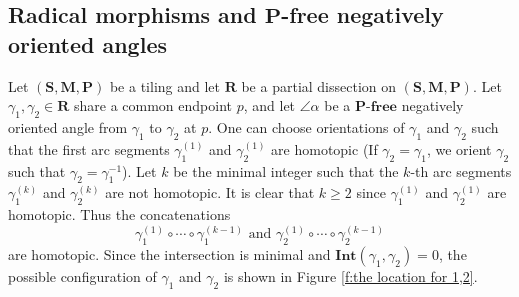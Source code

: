 \documentclass[a4paper,10pt]{amsart}
\theoremstyle{plain}          %
\theoremstyle{definition}
\newtheorem{definition}[theorem]{Definition}
\def\SS{\mathbf{S}}
\def\MM{\mathbf{M}}
\def\PP{\mathbf{P}}
\def\MM{\mathbf{M}}
\newcommand{\Int}{\mathbf{Int}}
\begin{document}




\subsection{Radical morphisms and $\mathbf{P}$-free negatively oriented angles}
Let $(\SS,\MM,\PP)$ be a tiling and let $\mathbf{R}$ be a partial dissection on $(\SS,\MM,\PP)$. Let $\gamma_1, \gamma_2\in\mathbf{R}$  share a common endpoint $p$, and 
let $\angle\alpha$ be a $\PP$-$\mathbf{free}$ negatively oriented angle from $\gamma_1$ to $\gamma_2$ at $p$. One can choose orientations of $\gamma_1$ and $\gamma_2$ such that the first arc segments $\gamma_1^{(1)}$ and $\gamma_2^{(1)}$ are homotopic (If $\gamma_2 = \gamma_1$, we orient $\gamma_2$ such that $\gamma_2 = \gamma_1^{-1}$). Let $k$ be the minimal integer such that the $k$-th arc segments $\gamma_1^{(k)}$ and $\gamma_2^{(k)}$ are not homotopic. It is clear that $k\ge 2$ since  $\gamma_1^{(1)}$ and $\gamma_2^{(1)}$ are homotopic. Thus the concatenations $$\gamma_1^{(1)} \circ \cdots \circ \gamma_1^{(k-1)}\text{ and }\gamma_2^{(1)} \circ \cdots \circ \gamma_2^{(k-1)}$$ are homotopic.
Since the intersection is minimal and $\Int(\gamma_1,\gamma_2)=0$,
the possible configuration of $\gamma_1$ and $\gamma_2$ is shown in Figure \ref{f:the location for 1,2}. 
\end{document}
